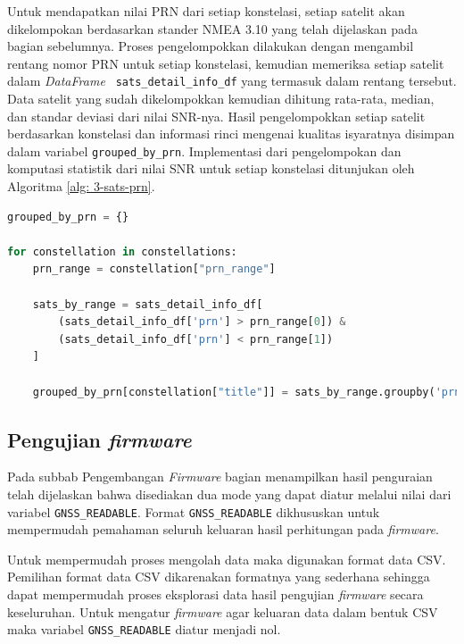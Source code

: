 Untuk mendapatkan nilai PRN dari setiap konstelasi, setiap satelit akan dikelompokan berdasarkan stander NMEA 3.10 yang telah dijelaskan pada bagian sebelumnya. Proses pengelompokkan dilakukan dengan mengambil rentang nomor PRN untuk setiap konstelasi, kemudian memeriksa setiap satelit dalam \textit{DataFrame} \texttt{ sats\_detail\_info\_df} yang termasuk dalam rentang tersebut. Data satelit yang sudah dikelompokkan kemudian dihitung rata-rata, median, dan standar deviasi dari nilai SNR-nya. Hasil pengelompokkan setiap satelit berdasarkan konstelasi dan informasi rinci mengenai kualitas isyaratnya disimpan dalam variabel \texttt{grouped\_by\_prn}. Implementasi dari pengelompokan dan komputasi statistik dari nilai SNR untuk setiap konstelasi ditunjukan oleh Algoritma \ref{alg: 3-sats-prn}.

\vspace{0.3cm}
\begin{lstlisting}[language=python, style=mystyle, caption={Mengelompokan Satelit Berdasarkan PRN-nya pada Python}, label={lst: 3-sats-prn}]
grouped_by_prn = {}

for constellation in constellations:
	prn_range = constellation["prn_range"]
	
	sats_by_range = sats_detail_info_df[
		(sats_detail_info_df['prn'] > prn_range[0]) & 
		(sats_detail_info_df['prn'] < prn_range[1])
	]
	
	grouped_by_prn[constellation["title"]] = sats_by_range.groupby('prn')['snr'].agg(['mean', 'median', 'std'])
\end{lstlisting}
\fi

\subsection{Pengujian \textit{firmware}}
Pada subbab Pengembangan \textit{Firmware} bagian menampilkan hasil penguraian telah dijelaskan bahwa disediakan dua mode yang dapat diatur melalui nilai dari variabel \texttt{GNSS\_READABLE}. Format \texttt{GNSS\_READABLE} dikhususkan untuk mempermudah pemahaman seluruh keluaran hasil perhitungan pada \textit{firmware}.

Untuk mempermudah proses mengolah data maka digunakan format data CSV. Pemilihan format data CSV dikarenakan formatnya yang sederhana sehingga dapat mempermudah proses eksplorasi data hasil pengujian \textit{firmware} secara keseluruhan. Untuk mengatur \textit{firmware} agar keluaran data dalam bentuk CSV maka variabel \texttt{GNSS\_READABLE} diatur menjadi nol.

